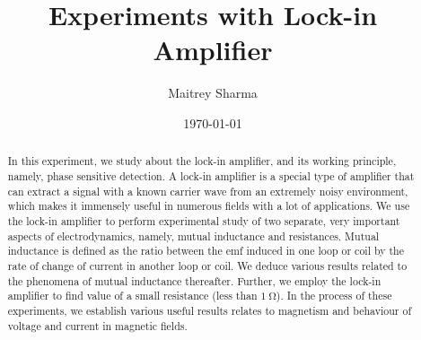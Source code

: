 \documentclass[%
 reprint,
nofootinbib,
 amsmath,amssymb,
 aps,
]{revtex4-2}
\begin{document}

\title{Experiments with Lock-in Amplifier}%


\author{Maitrey Sharma}




\date{\today}%

\begin{abstract}
    In this experiment, we study about the lock-in amplifier, and its working principle, namely, phase sensitive detection. A lock-in amplifier is a special type of amplifier that can extract a signal with a known carrier wave from an extremely noisy environment, which makes it immensely useful in numerous fields with a lot of applications. We use the lock-in amplifier to perform experimental study of two separate, very important aspects of electrodynamics, namely, mutual inductance and resistances. Mutual inductance is defined as the ratio between the emf induced in one loop or coil by the rate of change of current in another loop or coil. We deduce various results related to the phenomena of mutual inductance thereafter. Further, we employ the lock-in amplifier to find value of a small resistance (less than $\SI{1}{\ohm}$). In the process of these experiments, we establish various useful results relates to magnetism and behaviour of voltage and current in magnetic fields.
\end{abstract}

\maketitle

\end{document}
